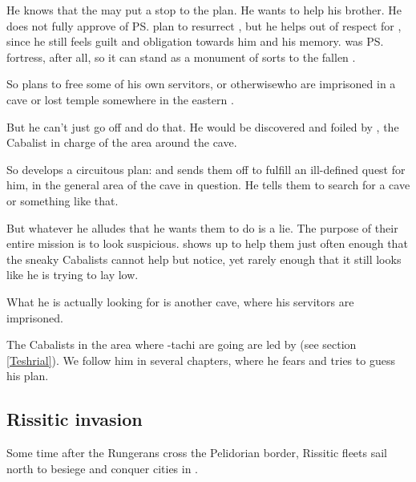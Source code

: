 He knows that the \noggyaleth{} may put a stop to the plan. 
He wants to help his brother.
He does not fully approve of \ps{\Secherdamon} plan to resurrect \Nithdornazsh, but he helps out of respect for , since he still feels guilt and obligation towards him and his memory. 
\Nithd{} was \ps{\Nexagglachel}{} fortress, after all, so it can stand as a monument of sorts to the fallen \dragonking.

So \Ishnaruchaefir{} plans to free some of his own servitors\dash\pdaemons, \dragons{} or otherwise\dash who are imprisoned in a cave or lost temple somewhere in the eastern \PelidorContinent. 

But he can't just go off and do that. He would be discovered and foiled by , the Cabalist in charge of the area around the cave. 

So \Ishnaruchaefir{} develops a circuitous plan: 
 and sends them off to fulfill an ill-defined quest for him, in the general area of the cave in question. He tells them to search for a cave or something like that. 

But whatever he alludes that he wants them to do is a lie. The purpose of their entire mission is to look suspicious. \Ishnaruchaefir{} shows up to help them just often enough that the sneaky Cabalists cannot help but notice, yet rarely enough that it still looks like he is trying to lay low. 

What he is actually looking for is another cave, where his servitors are imprisoned. 

The Cabalists in the area where \Shilred-tachi are going are led by \Teshrial{} (see section \ref{Teshrial}). We follow him in several chapters, where he fears \Ishnaruchaefir{} and tries to guess his plan. 






\subsection{Rissitic invasion}
Some time after the Rungerans cross the Pelidorian border, Rissitic fleets sail north to besiege and conquer cities in \Scyrum. 



